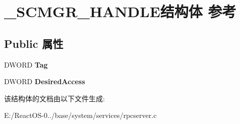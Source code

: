 \hypertarget{struct___s_c_m_g_r___h_a_n_d_l_e}{}\section{\+\_\+\+S\+C\+M\+G\+R\+\_\+\+H\+A\+N\+D\+L\+E结构体 参考}
\label{struct___s_c_m_g_r___h_a_n_d_l_e}
\subsection*{Public 属性}
\begin{DoxyCompactItemize}
\item 
\mbox{\label{struct___s_c_m_g_r___h_a_n_d_l_e_a3f1e00a4be1e2a4ad0296e8cd865e8e4}} 
D\+W\+O\+RD {\bfseries Tag}
\item 
\mbox{\label{struct___s_c_m_g_r___h_a_n_d_l_e_ae9990ff06bd7cf5ec8020bc910167bf7}} 
D\+W\+O\+RD {\bfseries Desired\+Access}
\end{DoxyCompactItemize}


该结构体的文档由以下文件生成\+:\begin{DoxyCompactItemize}
\item 
E\+:/\+React\+O\+S-\/0../base/system/services/rpcserver.\+c\end{DoxyCompactItemize}
